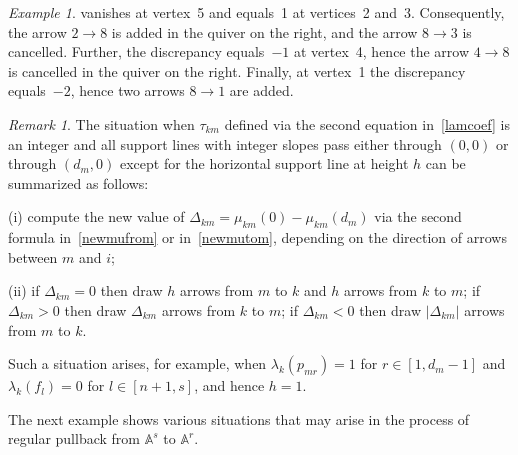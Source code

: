\documentclass{amsart}
\theoremstyle{definition}
\theoremstyle{remark}
\newtheorem{remark}[theorem]{Remark}
\newtheorem{example}[theorem]{Example}
\numberwithin{equation}{section}
\numberwithin{theorem}{section}
\def\AA{{\mathbb A}}
\def\sign{{\operatorname{sign}}}
\begin{document}
\begin{example}
vanishes at vertex~5 and equals~1 at vertices~2 and~3. Consequently,  
 the arrow $2\to8$ is added in the quiver on the right, and the arrow $8\to3$ is cancelled.
Further, the discrepancy equals~$-1$ at vertex~4, hence the arrow $4\to8$ is cancelled in the quiver on the right. Finally, at vertex~1 the discrepancy equals~$-2$, hence two arrows $8\to1$ are added.
\end{example}

\begin{remark}
The situation when $\tau_{km}$ defined via the second equation in~\eqref{lamcoef} is an integer and all support lines with integer slopes pass either through $(0,0)$ or through $(d_m,0)$ except for the horizontal support line at height $h$ can be summarized as follows:

(i) compute the new value of $\Delta_{km}=\mu_{km}(0)-\mu_{km}(d_m)$ via the second formula in~\eqref{newmufrom} or in~\eqref{newmutom}, depending on the direction of arrows between $m$ and $i$;

(ii) if $\Delta_{km}=0$ then draw $h$ arrows from $m$ to $k$ and $h$ arrows from $k$ to $m$; if $\Delta_{km}>0$ then 
draw $\Delta_{km}$ arrows from $k$ to $m$; if $\Delta_{km}<0$ then 
draw $|\Delta_{km}|$ arrows from $m$ to $k$. 

Such a situation arises, for example, when $\lambda_{k}(p_{mr})=1$ for $r\in[1,d_m-1]$ and $\lambda_k(f_l)=0$ for 
$l\in [n+1,s]$, and hence $h=1$.
\end{remark}


The next example shows various situations that may arise in the process of regular pullback from $\AA^s$ to $\AA^r$.
\end{document}
